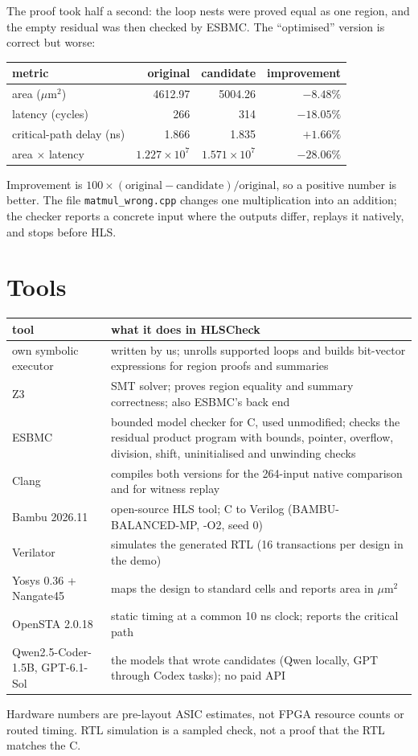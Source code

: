 \documentclass[10pt,a4paper]{article}
\begin{document}
The proof took half a second: the loop nests were proved equal as one region, and the empty residual
was then checked by ESBMC. The ``optimised'' version is correct but worse:
\begin{center}\small
\begin{tabular}{@{}lrrr@{}}\toprule
metric & original & candidate & improvement\\\midrule
area ($\mu$m$^2$) & 4612.97 & 5004.26 & $-8.48\%$\\
latency (cycles) & 266 & 314 & $-18.05\%$\\
critical-path delay (ns) & 1.866 & 1.835 & $+1.66\%$\\
area $\times$ latency & $1.227\times10^7$ & $1.571\times10^7$ & $-28.06\%$\\\bottomrule
\end{tabular}
\end{center}
Improvement is $100\times(\text{original}-\text{candidate})/\text{original}$, so a positive number is
better. The file \texttt{matmul\_wrong.cpp} changes one multiplication into an addition; the checker
reports a concrete input where the outputs differ, replays it natively, and stops before HLS.

\section{Tools}
\begin{center}\small
\noindent\begin{tabularx}{\linewidth}{@{}>{\raggedright\arraybackslash}p{3.1cm}X@{}}\toprule
tool & what it does in HLSCheck\\\midrule
own symbolic executor & written by us; unrolls supported loops and builds bit-vector expressions for region proofs and summaries\\
Z3 & SMT solver; proves region equality and summary correctness; also ESBMC's back end\\
ESBMC & bounded model checker for C, used unmodified; checks the residual product program with bounds, pointer, overflow, division, shift, uninitialised and unwinding checks\\
Clang & compiles both versions for the 264-input native comparison and for witness replay\\
Bambu 2026.11 & open-source HLS tool; C to Verilog (BAMBU-BALANCED-MP, -O2, seed 0)\\
Verilator & simulates the generated RTL (16 transactions per design in the demo)\\
Yosys 0.36 + Nangate45 & maps the design to standard cells and reports area in $\mu$m$^2$\\
OpenSTA 2.0.18 & static timing at a common 10 ns clock; reports the critical path\\
Qwen2.5-Coder-1.5B, GPT-6.1-Sol & the models that wrote candidates (Qwen locally, GPT through Codex tasks); no paid API\\\bottomrule
\end{tabularx}
\end{center}
Hardware numbers are pre-layout ASIC estimates, not FPGA resource counts or routed timing. RTL
simulation is a sampled check, not a proof that the RTL matches the C.
\end{document}
